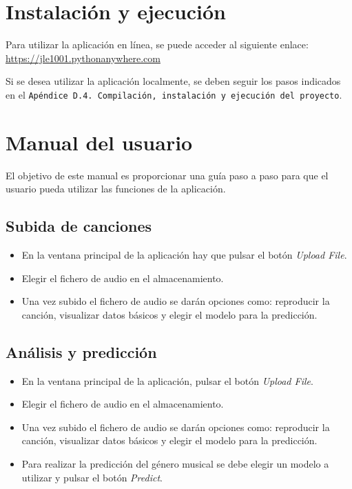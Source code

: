 \section{Instalación y ejecución}

Para utilizar la aplicación en línea, se puede acceder al siguiente enlace: \url{https://jle1001.pythonanywhere.com}

Si se desea utilizar la aplicación localmente, se deben seguir los pasos indicados en el \texttt{Apéndice D.4. Compilación, instalación y ejecución del proyecto}.

\section{Manual del usuario}
El objetivo de este manual es proporcionar una guía paso a paso para que el usuario pueda utilizar las funciones de la aplicación.

\subsection{Subida de canciones}
\begin{itemize}
\tightlist

\item En la ventana principal de la aplicación hay que pulsar el botón \textit{Upload File}.
\item Elegir el fichero de audio en el almacenamiento.
\item Una vez subido el fichero de audio se darán opciones como: reproducir la canción, visualizar datos básicos y elegir el modelo para la predicción.

\end{itemize}


\subsection{Análisis y predicción}

\begin{itemize}
\tightlist

\item En la ventana principal de la aplicación, pulsar el botón \textit{Upload File}.
\item Elegir el fichero de audio en el almacenamiento.
\item Una vez subido el fichero de audio se darán opciones como: reproducir la canción, visualizar datos básicos y elegir el modelo para la predicción.
\item Para realizar la predicción del género musical se debe elegir un modelo a utilizar y pulsar el botón \textit{Predict}.

\end{itemize}

